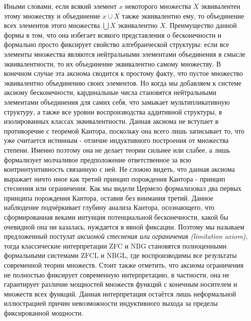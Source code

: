 \documentclass[12pt]{article}
\begin{document}
Иными словами, если всякий элемент $x$ некоторого множества $X$ эквивалентен этому множеству и объединение $x \cup X$ также эквивалентно ему, то объединение всех элементов этого множества $\bigcup X$ эквивалентно $X$. Преимущество данной формы в том, что она избегает всякого представления о бесконечности и формально просто фиксирует свойство алгебраической структуры: если все элементы множества являются нейтральными элементами объединения в смысле эквивалентности, то их объединение эквивалентно самому множеству. В конечном случае эта аксиома сводится к простому факту, что пустое множество эквивалентно объединению своих элементов. Но когда мы добавляем к системе аксиому бесконечности, кардинальные числа становятся нейтральными элементами объединения для самих себя, что замыкает мультипликативную структуру, а также все уровни воспроизводства аддитивной структуры, в изолированных классах эквивалентности. Данная аксиома не вступает в противоречие с теоремой Кантора, поскольку она всего лишь записывает то, что уже считается истинным - отличие индуктивного построения от множества степени. Именно поэтому она не делает теории сильнее или слабее, а лишь формализует молчаливое предположение ответственное за всю контринтуитивность связанную с ней. Не сложно видеть, что данная аксиома выражает ничто иное как третий принцип порождения Кантора - принцип стеснения или ограничения. Как мы видели Цермело формализовал два первых принципа порождения Кантора, оставив без внимания третий. Данное наблюдение подчёркивает глубину анализа Кантора, осознающего, что сформированная веками интуиция потенциальной бесконечности, какой бы очевидной она ни казалась, нуждается в явной фиксации. Поэтому мы называем предложенный постулат {\it аксиомой стеснения или ограничения (limitation axiom)}, тогда классические интерпретации ZFC и NBG становятся полноценными формальными системами ZFCL и NBGL, где воспроизводимы все результаты современной теории множеств. Стоит также отметить, что аксиома ограничения не полностью фиксирует современную интерпретацию, в частности, она не гарантирует различие мощностей множеств функций с конечным носителем и множеств всех функций. Данная интерпретация остаётся лишь неформальной иллюстрацией причин невозможности индуктивного выхода за пределы фиксированной мощности. 
\end{document}
